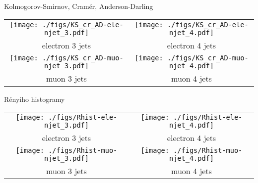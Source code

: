 \documentclass[11pt]{beamer}
\begin{document}
  \begin{frame}{Kolmogorov-Smirnov, Cramér, Anderson-Darling}
    \vspace{-.2cm}
    \begin{center}
      \begin{tabular}{cc}{\footnotesize}
	\texttt{[image: ./figs/KS\_cr\_AD-ele-njet\_3.pdf]}& 
	\texttt{[image: ./figs/KS\_cr\_AD-ele-njet\_4.pdf]}\\
	\footnotesize electron 3 jets&
	\footnotesize electron 4 jets\\
	\texttt{[image: ./figs/KS\_cr\_AD-muo-njet\_3.pdf]}&
	\texttt{[image: ./figs/KS\_cr\_AD-muo-njet\_4.pdf]}\\
	\footnotesize muon 3 jets&
	\footnotesize muon 4 jets
      \end{tabular}
    \end{center}
  \end{frame}
  
  \begin{frame}{Rényiho histogramy}
    \vspace{-.2cm}
    \begin{center}
      \begin{tabular}{cc}{\footnotesize}
	\texttt{[image: ./figs/Rhist-ele-njet\_3.pdf]}& 
	\texttt{[image: ./figs/Rhist-ele-njet\_4.pdf]}\\
	\footnotesize electron 3 jets&
	\footnotesize electron 4 jets\\
	\texttt{[image: ./figs/Rhist-muo-njet\_3.pdf]}&
	\texttt{[image: ./figs/Rhist-muo-njet\_4.pdf]}\\
	\footnotesize muon 3 jets&
	\footnotesize muon 4 jets
      \end{tabular}
    \end{center}
  \end{frame}
  
\end{document}
